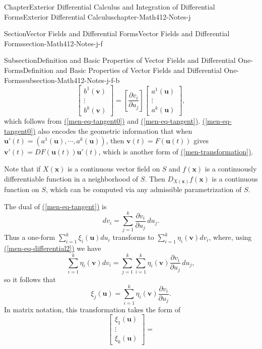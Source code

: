 \documentclass[oneside,10pt,]{book}
\newcommand{\xreffont}{\relax}
\numberwithin{equation}{section}
\newcommand{\bu}{\mathbf{u}}
\newcommand{\bv}{\mathbf{v}}
\newcommand{\bx}{\mathbf{x}}
\begin{document}
\begin{chapterptx}{Chapter}{Exterior Differential Calculus and Integration of Differential Forms}{}{Exterior Differential Calculus}{}{}{chapter-Math412-Notes-j}
\begin{sectionptx}{Section}{Vector Fields and Differential Forms}{}{Vector Fields and Differential Forms}{}{}{section-Math412-Notes-j-f}
\begin{subsectionptx}{Subsection}{Definition and Basic Properties of Vector Fields and Differential One-Forms}{}{Definition and Basic Properties of Vector Fields and Differential One-Forms}{}{}{subsection-Math412-Notes-j-f-b}
\begin{equation}
\begin{bmatrix} b^{1}(\bv)\\ \vdots \\ b^{k}(\bv)\end{bmatrix} =
\left[\frac{\partial v_{i}}{\partial u_{j}}\right] \begin{bmatrix} a^{1}(\bu)\\ \vdots \\ a^{k}(\bu)\end{bmatrix},\label{men-transformation}
\end{equation}
which follows from  \hyperref[men-eq-tangent0]{({\xreffont\ref{men-eq-tangent0}})} and \hyperref[men-eq-tangent]{({\xreffont\ref{men-eq-tangent}})}. \hyperref[men-eq-tangent0]{({\xreffont\ref{men-eq-tangent0}})} also encodes the geometric information that when \(\bu'(t)=(a^{1}(\bu), \cdots, a^{k}(\bu))\), then \(\bv(t)=F(\bu(t))\) gives \(\bv'(t)=DF(\bu(t))\bu'(t)\), which is another form of \hyperref[men-transformation]{({\xreffont\ref{men-transformation}})}.%
\par
Note that if \(X(\bx)\) is a continuous vector field on \(S\) and \(f(\bx)\) is a continuously  differentiable function in a neighborhood of \(S\). Then \(D_{X(\bx)}f(\bx)\) is a continuous function on \(S\), which can be computed via any  admissible parametrization of \(S\).%
\par
The dual of  \hyperref[men-eq-tangent]{({\xreffont\ref{men-eq-tangent}})} is%
\begin{equation}
d v_{i}= \sum_{j=1}^{k} \frac{\partial v_{i}}{\partial u_{j}} \, du_{j}.\label{men-eq-differential2}
\end{equation}
Thus a one-form  \(\sum_{i=1}^{k}\xi_{i}(\bu) du_{i}\) transforms to \(\sum_{i=1}^{k}\eta_{i}(\bv) dv_{i}\), where, using \hyperref[men-eq-differential2]{({\xreffont\ref{men-eq-differential2}})} we have%
\begin{equation*}
\sum_{i=1}^{k}\eta_{i}(\bv) dv_{i}=
\sum_{j=1}^{k} \sum_{i=1}^{k}\eta_{i}(\bv) \frac{\partial v_{i}}{\partial u_{j}} \, du_{j},
\end{equation*}
so it follows that%
\begin{equation}
\xi_{j}(\bu)= \sum_{i=1}^{k}\eta_{i}(\bv) \frac{\partial v_{i}}{\partial u_{j}}.\label{men-cot-transformation}
\end{equation}
In matrix notation, this transformation takes the form of%
\begin{equation*}
\begin{bmatrix} \xi_{1}(\bu)\\ \vdots \\ \xi_{k}(\bu)\end{bmatrix} =

\end{equation*}
\end{subsectionptx}
\end{sectionptx}
\end{chapterptx}
\end{document}
